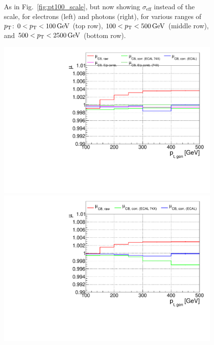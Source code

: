 \begin{figure}[hbtp]
\begin{center}
    \caption{
        As in Fig.~\ref{fig:pt100_scale}, but now showing $\sigma_\text{eff}$ instead of the scale, for electrons (left) and photons (right), for various ranges of $p_\mathrm{T}$:
        $0 < p_\mathrm{T} < 100\,\text{GeV}$ (top row),
        $100 < p_\mathrm{T} < 500\,\text{GeV}$ (middle row),
        and $500 < p_\mathrm{T} < 2500\,\text{GeV}$ (bottom row).
        }
    \label{fig:effsigma}
  \end{center}
\end{figure}


\begin{figure}[hbtp]
  \begin{center}
    \includegraphics[width=\halflinewidth]{img/regression/pt500_scale_electrons.pdf}
    \includegraphics[width=\halflinewidth]{img/regression/pt500_scale_photons.pdf}
    \\

\end{center}
\end{figure}
